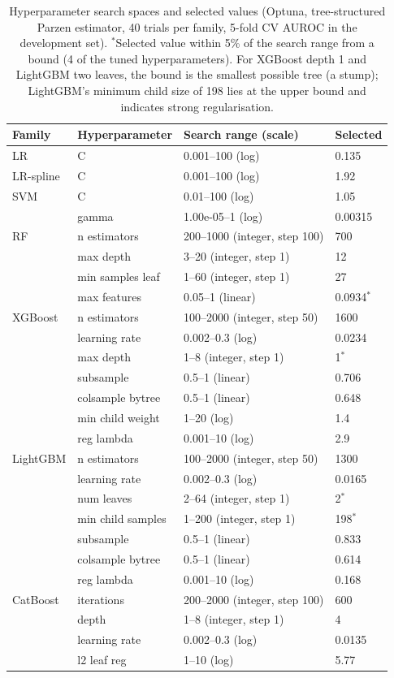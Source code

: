 \documentclass[11pt,a4paper]{article}
\begin{document}
\begin{table}[H]
\centering
\caption{Hyperparameter search spaces and selected values (Optuna, tree-structured Parzen estimator, 40 trials per family, 5-fold CV AUROC in the development set). $^*$Selected value within 5\% of the search range from a bound (4 of the tuned hyperparameters). For XGBoost depth 1 and LightGBM two leaves, the bound is the smallest possible tree (a stump); LightGBM's minimum child size of 198 lies at the upper bound and indicates strong regularisation.}
\label{tab:hyper}
\footnotesize
\begin{tabular}{llll}
\toprule
Family & Hyperparameter & Search range (scale) & Selected \\
\midrule
LR & C & 0.001--100 (log) & 0.135 \\
\addlinespace
LR-spline & C & 0.001--100 (log) & 1.92 \\
\addlinespace
SVM & C & 0.01--100 (log) & 1.05 \\
 & gamma & 1.00e-05--1 (log) & 0.00315 \\
\addlinespace
RF & n estimators & 200--1000 (integer, step 100) & 700 \\
 & max depth & 3--20 (integer, step 1) & 12 \\
 & min samples leaf & 1--60 (integer, step 1) & 27 \\
 & max features & 0.05--1 (linear) & 0.0934$^*$ \\
\addlinespace
XGBoost & n estimators & 100--2000 (integer, step 50) & 1600 \\
 & learning rate & 0.002--0.3 (log) & 0.0234 \\
 & max depth & 1--8 (integer, step 1) & 1$^*$ \\
 & subsample & 0.5--1 (linear) & 0.706 \\
 & colsample bytree & 0.5--1 (linear) & 0.648 \\
 & min child weight & 1--20 (log) & 1.4 \\
 & reg lambda & 0.001--10 (log) & 2.9 \\
\addlinespace
LightGBM & n estimators & 100--2000 (integer, step 50) & 1300 \\
 & learning rate & 0.002--0.3 (log) & 0.0165 \\
 & num leaves & 2--64 (integer, step 1) & 2$^*$ \\
 & min child samples & 1--200 (integer, step 1) & 198$^*$ \\
 & subsample & 0.5--1 (linear) & 0.833 \\
 & colsample bytree & 0.5--1 (linear) & 0.614 \\
 & reg lambda & 0.001--10 (log) & 0.168 \\
\addlinespace
CatBoost & iterations & 200--2000 (integer, step 100) & 600 \\
 & depth & 1--8 (integer, step 1) & 4 \\
 & learning rate & 0.002--0.3 (log) & 0.0135 \\
 & l2 leaf reg & 1--10 (log) & 5.77 \\
\bottomrule
\end{tabular}
\end{table}
\end{document}
